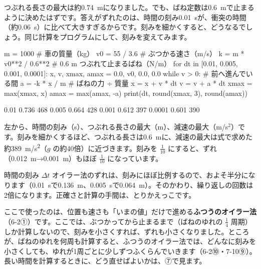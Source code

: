 \noindent つぶれる長さの最大は約\qty{0.74}{m}になりました。でも、ばね定数は\qty{0.6}{m}で止まるように決めたはずです。答えがずれたのは、時間の刻み\qty{0.01}{s}が、衝突の時間（約\qty{0.06}{s}）に比べて大きすぎるからです。刻みを細かくすると、どうなるでしょう。同じ計算をプログラムにして、刻みを変えてみます。
\begin{phcode}
m = 1000                  \# 車の質量（kg）\hfill\null
v0 = 55 / 3.6             \# ぶつかる速さ（m/s）
k = m * v0**2 / 0.6**2    \# 0.6 m つぶれて止まるばね（N/m）
for dt in [0.01, 0.005, 0.001, 0.0001]:
    x, v, xmax, amax = 0.0, v0, 0.0, 0.0
    while v > 0:          \# 前へ進んでいる間
        a = -k * x / m    \# ばねの力 ÷ 質量
        x = x + v * dt
        v = v + a * dt
        xmax = max(xmax, x)
        amax = max(amax, -a)
    print(dt, round(xmax, 3), round(amax))
\end{phcode}
\begin{phcodeout}
0.01 0.736 468
0.005 0.664 428
0.001 0.612 397
0.0001 0.601 390
\end{phcodeout}
\noindent 左から、時間の刻み（s）、つぶれる長さの最大（m）、減速の最大（m/s$^2$）です。刻みを細かくするほど、つぶれる長さは\qty{0.6}{m}に、減速の最大は式で求めた約\qty{389}{m/s^2}（$g$ の約40倍）に近づきます。刻みを $\tfrac{1}{10}$ にすると、ずれ（\mbox{\qty{0.012}{m}→\qty{0.001}{m}}）もほぼ $\tfrac{1}{10}$ になっています。
\begin{phbaisuru}[半分]{時間の刻み $\Delta t$}
オイラー法のずれは、刻みにほぼ比例するので、およそ半分になります（\qty{0.01}{s}で\qty{0.136}{m}、\qty{0.005}{s}で\qty{0.064}{m}）。そのかわり、繰り返しの回数は2倍になります。正確さと計算の手間は、とりかえっこです。
\end{phbaisuru}

ここで使ったのは、位置も速さも「いまの値」だけで進める\textbf{ふつうのオイラー法}（\mbox{6-2①}）です。ここでは、ぶつかってから止まるまで（ばねのゆれの $\tfrac{1}{4}$ 周期）しか計算しないので、刻みを小さくすれば、ずれも小さくなりました。ところが、ばねのゆれを何周も計算すると、ふつうのオイラー法では、どんなに刻みを小さくしても、ゆれが1周ごとに少しずつふくらんでいきます（\mbox{6-2⑩}・\mbox{7-10⑨}）。長い時間を計算するときに、どう直せばよいかは、⑦で見ます。

